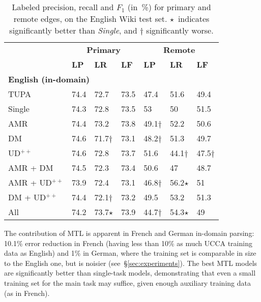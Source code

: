 \documentclass[11pt,a4paper]{article}
\begin{document}
\begin{table}[t]
\centering
\small
\setlength\tabcolsep{3pt}
\begin{tabular}{l|lll|lll}
& \multicolumn{3}{c|}{\footnotesize \bf Primary} & \multicolumn{3}{c}{\footnotesize \bf Remote} \\
& \footnotesize \textbf{LP} & \footnotesize \textbf{LR} & \footnotesize \textbf{LF}
& \footnotesize \textbf{LP} & \footnotesize \textbf{LR} & \footnotesize \textbf{LF} \\
\hline
\multicolumn{4}{l|}{\small \bf English (in-domain)} & \\
\footnotesize TUPA
& 74.4 & 72.7 & 73.5 & 47.4 & 51.6 & 49.4 \\
\footnotesize Single
& 74.3 & 72.8 & 73.5 & 53 & 50 & 51.5 \\
\cline{1-1}
\footnotesize AMR
& 74.4 & 73.2 & 73.8 & 49.1$\dagger$ & 52.2 & 50.6 \\
\footnotesize DM
& 74.6 & 71.7$\dagger$ & 73.1 & 48.2$\dagger$ & 51.3 & 49.7 \\
\footnotesize UD$^{++}$
& 74.6 & 72.8 & 73.7 & 51.6 & 44.1$\dagger$ & 47.5$\dagger$ \\
\footnotesize AMR + DM
& 74.5 & 72.3 & 73.4 & 50.6 & 47 & 48.7 \\
\footnotesize AMR + UD$^{++}$
& 73.9 & 72.4 & 73.1 & 46.8$\dagger$ & 56.2$\star$ & 51 \\
\footnotesize DM + UD$^{++}$
& 74.4 & 72.1$\dagger$ & 73.2 & 49.5 & 53.2 & 51.3 \\
\footnotesize All
& 74.2 & 73.7$\star$ & 73.9 & 44.7$\dagger$ & 54.3$\star$ & 49
\end{tabular}
\caption{
Labeled precision, recall and $F_1$ (in~\%) for primary and remote edges,
on the English Wiki test set.
$\star$~indicates significantly better than \textit{Single},
and $\dagger$ significantly worse.}\label{tab:id_results}
\end{table}


The contribution of MTL is apparent in French and German in-domain parsing:
10.1\% error reduction in French
(having less than 10\% as much UCCA training data as English)
and 1\% in German, where the training set is comparable in size to the English one,
but is noisier (see~\S\ref{sec:experiments}).
The best MTL models are significantly better than single-task models,
demonstrating that even a small training set for the main task may suffice,
given enough auxiliary training data (as in French).
\end{document}
